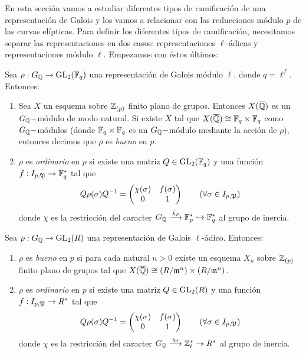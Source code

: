 \documentclass[../../tesis_maestria]{subfiles}
\begin{document}
En esta secci\'on vamos a estudiar diferentes tipos de ramificaci\'on de una representaci\'on de
Galois y los vamos a relacionar con las reducciones m\'odulo $p$ de las curvas el\'ipticas. Para
definir los diferentes tipos de ramificaci\'on, necesitamos separar las representaciones en dos
casos: representaciones $\ell$-\'adicas y representaciones m\'odulo $\ell$. Empezamos con \'estos
\'ultimos:

\begin{defin}
  Sea $\rho:G_{\mathbb{Q}}\rightarrow\mathrm{GL}_2(\mathbb{F}_{q})$ una representaci\'on de Galois m\'odulo $\ell$, donde $q=\ell^f$.
  Entonces:
  \begin{enumerate}
  \item Sea $X$ un esquema sobre $\mathbb{Z}_{(p)}$ finito plano de grupos. Entonces $X(\overline{\mathbb{Q}})$ es
    un $G_{\mathbb{Q}}-$m\'odulo de modo natural. Si existe $X$ tal que $X(\overline{\mathbb{Q}})\cong\mathbb{F}_q\times\mathbb{F}_q$
    como $G_{\mathbb{Q}}-$m\'odulos (donde $\mathbb{F}_q\times\mathbb{F}_q$ es un $G_{\mathbb{Q}}-$m\'odulo mediante la acci\'on de
    $\rho$), entonces decimos que $\rho$ es \emph{bueno} en $p$. 
  \item $\rho$ es \emph{ordinario} en $p$ si existe una matriz $Q\in\mathrm{GL}_2(\mathbb{F}_q)$ y una
    funci\'on $f:I_{p,\mathfrak{P}}\rightarrow\mathbb{F}_q^*$ tal que
    \[
      Q \rho(\sigma) Q^{-1}=\begin{pmatrix}\chi(\sigma) & f(\sigma)\\ 0&1\end{pmatrix}
      \qquad (\forall\sigma\in I_{p,\mathfrak{P}})
    \]
    donde $\chi$ es la restricci\'on del caracter
    $G_{\mathbb{Q}}\overset{\bar{\chi}_p}{\longrightarrow}\mathbb{F}_p^*\hookrightarrow\mathbb{F}_q^*$ al grupo de inercia.
  \end{enumerate}
\end{defin}

\begin{defin}
  Sea $\rho:G_{\mathbb{Q}}\rightarrow\mathrm{GL}_2(R)$ una representaci\'on de Galois $\ell$-\'adico. Entonces:
  \begin{enumerate}
  \item $\rho$ es \emph{bueno} en $p$ si para cada natural $n>0$ existe un esquema $X_n$
    sobre $\mathbb{Z}_{(p)}$ finito plano de grupos tal que $X(\overline{\mathbb{Q}})\cong(R/\mathfrak{m}^n)\times(R/\mathfrak{m}^n)$.
  \item $\rho$ es \emph{ordinario} en $p$ si existe una matriz $Q\in\mathrm{GL}_2(R)$ y una
    funci\'on $f:I_{p,\mathfrak{P}}\rightarrow R^*$ tal que
    \[
      Q \rho(\sigma) Q^{-1}=\begin{pmatrix}\chi(\sigma) & f(\sigma)\\ 0&1\end{pmatrix}
      \qquad (\forall\sigma\in I_{p,\mathfrak{P}})
    \]
    donde $\chi$ es la restricci\'on del caracter $G_{\mathbb{Q}}\overset{\chi_{\ell}}{\longrightarrow}\mathbb{Z}_{\ell}^*\rightarrow R^*$ al
    grupo de inercia.
  \end{enumerate}
\end{defin}
\end{document}
